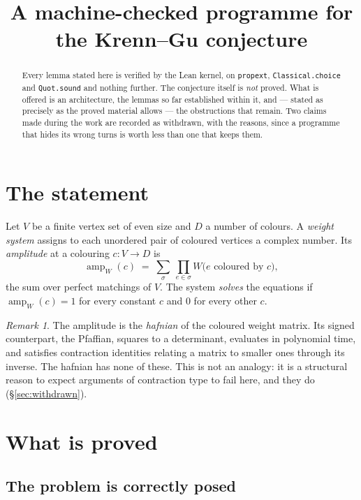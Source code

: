 \documentclass[11pt]{article}
\title{A machine-checked programme for the Krenn--Gu conjecture}
\author{}
\date{}
\theoremstyle{definition}
\theoremstyle{remark}
\newtheorem{remark}[theorem]{Remark}
\newcommand{\amp}{\operatorname{amp}}
\begin{document}
\maketitle

\begin{abstract}
Every lemma stated here is verified by the Lean kernel, on \texttt{propext},
\texttt{Classical.choice} and \texttt{Quot.sound} and nothing further. The
conjecture itself is \emph{not} proved. What is offered is an architecture, the
lemmas so far established within it, and --- stated as precisely as the proved
material allows --- the obstructions that remain. Two claims made during the work
are recorded as withdrawn, with the reasons, since a programme that hides its wrong
turns is worth less than one that keeps them.
\end{abstract}

\section{The statement}

Let $V$ be a finite vertex set of even size and $D$ a number of colours. A
\emph{weight system} assigns to each unordered pair of coloured vertices a complex
number. Its \emph{amplitude} at a colouring $c\colon V\to D$ is
\[
  \amp_W(c)\;=\;\sum_{\sigma}\ \prod_{e\in\sigma} W\bigl(e\text{ coloured by }c\bigr),
\]
the sum over perfect matchings of $V$. The system \emph{solves} the equations if
$\amp_W(c)=1$ for every constant $c$ and $0$ for every other $c$.

\begin{remark}
The amplitude is the \emph{hafnian} of the coloured weight matrix. Its signed
counterpart, the Pfaffian, squares to a determinant, evaluates in polynomial time,
and satisfies contraction identities relating a matrix to smaller ones through its
inverse. The hafnian has none of these. This is not an analogy: it is a structural
reason to expect arguments of contraction type to fail here, and they do
(\S\ref{sec:withdrawn}).
\end{remark}

\section{What is proved}

\subsection{The problem is correctly posed}
\end{document}
